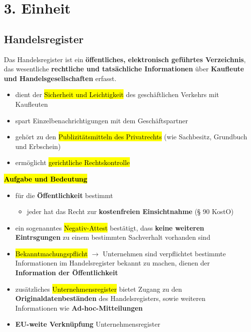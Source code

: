 \documentclass[a4paper, 10pt]{article}
\begin{document}
\section{3. Einheit}
\subsection{Handelsregister}
Das Handelsregister ist ein \textbf{öffentliches, elektronisch geführtes Verzeichnis}, das wesentliche \textbf{rechtliche und tatsächliche Informationen} über \textbf{Kaufleute und Handelsgesellschaften} erfasst.
\begin{itemize}
    \item dient der \hl{Sicherheit und Leichtigkeit} des geschäftlichen Verkehrs mit Kaufleuten
    \item spart Einzelbenachrichtigungen mit dem Geschäftspartner
    \item gehört zu den \hl{Publizitätsmitteln des Privatrechts} (wie Sachbesitz, Grundbuch und Erbschein)
    \item ermöglicht \hl{gerichtliche Rechtskontrolle}
\end{itemize}
\newpage
\noindent\textbf{\hl{Aufgabe und Bedeutung}}
\begin{itemize}
    \item für die \textbf{Öffentlichkeit} bestimmt
    \begin{itemize}
        \item jeder hat das Recht zur \textbf{kostenfreien Einsichtnahme} (§ 90 KostO)
    \end{itemize}

    \item ein sogenanntes \hl{Negativ-Attest} bestätigt, dass \textbf{keine weiteren Eintrsgungen} zu einem bestimmten Sachverhalt vorhanden sind
    \item \hl{Bekanntmachungspflicht} $\longrightarrow$ Unternehmen sind verpflichtet bestimmte Informationen im Handelsregister bekannt zu machen, dienen der \textbf{Information der Öffentlichkeit}
    \item zusätzliches \hl{Unternehmensregister} bietet Zugang zu den \textbf{Originaldatenbeständen} des Handelsregisters, sowie weiteren Informationen wie \textbf{Ad-hoc-Mitteilungen}
    \item \textbf{EU-weite Verknüpfung} Unternehmensregister
\end{itemize}
\end{document}
